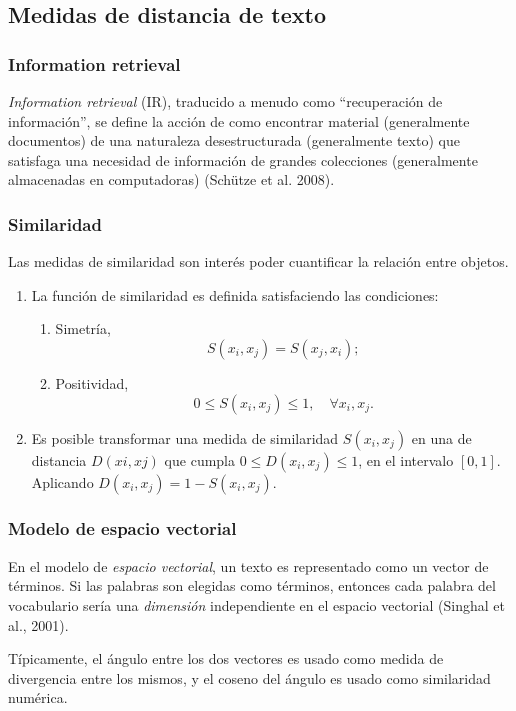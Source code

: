 \subsection{Medidas de distancia de texto}
\begin{frame}
	\frametitle{Information retrieval}
	\begin{tcolorbox}[colback=blue!5,colframe=blue!40!black,title=Information retrieval]
		\textit{Information retrieval} (IR), traducido a menudo como ``recuperación de información'', se define la acción de como encontrar material (generalmente documentos) de una naturaleza desestructurada (generalmente texto) que satisfaga una necesidad de información de grandes colecciones (generalmente almacenadas en computadoras) (Schütze et al. 2008).
	\end{tcolorbox}
\end{frame}

\begin{frame}
	\frametitle{Similaridad}
	Las medidas de similaridad son interés poder cuantificar la relación entre objetos.

	\bigskip

	\begin{enumerate}
			\item La función de similaridad es definida satisfaciendo las condiciones:
			\begin{enumerate}[<*>]
				\item Simetría,
				\[S(x_i,x_j)=S(x_j,x_i);\]

				\item Positividad,
				\[0 \leq S(x_i,x_j) \leq 1, \quad \forall x_i,x_j.\]
			\end{enumerate}

		\item \bigskip
		Es posible transformar una medida de similaridad \(S(x_i,x_j)\) en una de distancia \(D(xi,xj)\) que cumpla \(0 \leq D(x_i,x_j) \leq 1\), en el intervalo \([0,1]\). Aplicando \(D(x_i,x_j) = 1 - S(x_i,x_j)\).
	\end{enumerate}
\end{frame}

\begin{frame}
	\frametitle{Modelo de espacio vectorial}
	En el modelo de \textit{espacio vectorial}, un texto es representado como un vector de términos. Si las palabras son elegidas como términos, entonces cada palabra del vocabulario sería una \textit{dimensión} independiente en el espacio vectorial (Singhal et al., 2001).

	\bigskip

	Típicamente, el ángulo entre los dos vectores es usado como medida de divergencia entre los mismos, y el coseno del ángulo es usado como similaridad numérica.
\end{frame}

